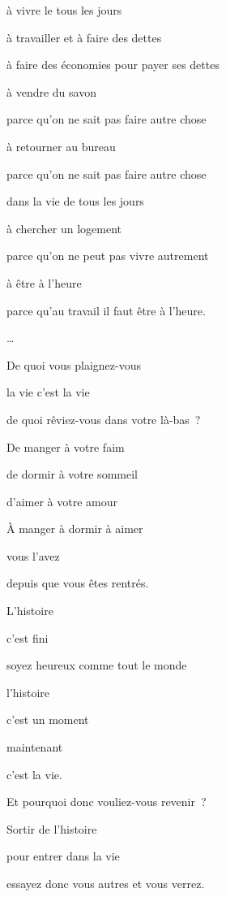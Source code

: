 {à vivre le tous les jours

à travailler et à faire des dettes

à faire des économies pour payer ses dettes

à vendre du savon

parce qu'on ne sait pas faire autre chose

à retourner au bureau

parce qu'on ne sait pas faire autre chose

dans la vie de tous les jours

à chercher un logement

parce qu'on ne peut pas vivre autrement

à être à l'heure

parce qu'au travail il faut être à l'heure.

…

De quoi vous plaignez-vous

la vie c'est la vie

de quoi rêviez-vous dans votre là-bas~?

De manger à votre faim

de dormir à votre sommeil

d'aimer à votre amour

À manger à dormir à aimer

vous l'avez

depuis que vous êtes rentrés.

L'histoire

c'est fini

soyez heureux comme tout le monde

l'histoire

c'est un moment

maintenant

c'est la vie.

Et pourquoi donc vouliez-vous revenir~?

\medskip

Sortir de l'histoire

pour entrer dans la vie

essayez donc vous autres et vous verrez.
	\setlength{\parskip}{6pt}
}


